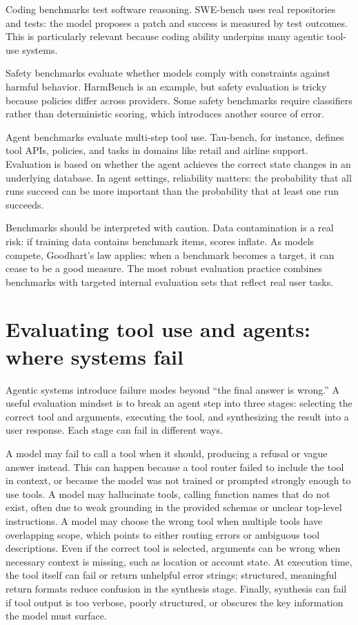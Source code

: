 Coding benchmarks test software reasoning. SWE-bench uses real repositories and tests: the model proposes a patch and success is measured by test outcomes. This is particularly relevant because coding ability underpins many agentic tool-use systems.

Safety benchmarks evaluate whether models comply with constraints against harmful behavior. HarmBench is an example, but safety evaluation is tricky because policies differ across providers. Some safety benchmarks require classifiers rather than deterministic scoring, which introduces another source of error.

Agent benchmarks evaluate multi-step tool use. Tau-bench, for instance, defines tool APIs, policies, and tasks in domains like retail and airline support. Evaluation is based on whether the agent achieves the correct state changes in an underlying database. In agent settings, reliability matters: the probability that all runs succeed can be more important than the probability that at least one run succeeds.

Benchmarks should be interpreted with caution. Data contamination is a real risk: if training data contains benchmark items, scores inflate. As models compete, Goodhart’s law applies: when a benchmark becomes a target, it can cease to be a good measure. The most robust evaluation practice combines benchmarks with targeted internal evaluation sets that reflect real user tasks.

\section{Evaluating tool use and agents: where systems fail}
Agentic systems introduce failure modes beyond “the final answer is wrong.” A useful evaluation mindset is to break an agent step into three stages: selecting the correct tool and arguments, executing the tool, and synthesizing the result into a user response. Each stage can fail in different ways.

A model may fail to call a tool when it should, producing a refusal or vague answer instead. This can happen because a tool router failed to include the tool in context, or because the model was not trained or prompted strongly enough to use tools. A model may hallucinate tools, calling function names that do not exist, often due to weak grounding in the provided schemas or unclear top-level instructions. A model may choose the wrong tool when multiple tools have overlapping scope, which points to either routing errors or ambiguous tool descriptions. Even if the correct tool is selected, arguments can be wrong when necessary context is missing, such as location or account state. At execution time, the tool itself can fail or return unhelpful error strings; structured, meaningful return formats reduce confusion in the synthesis stage. Finally, synthesis can fail if tool output is too verbose, poorly structured, or obscures the key information the model must surface.

